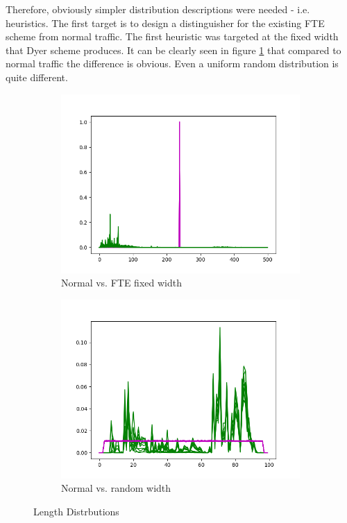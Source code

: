 \documentclass[10pt,a4paper]{article}
\begin{document}
Therefore, obviously simpler distribution descriptions were needed - i.e. heuristics. The first target is to design a distinguisher for the existing FTE scheme from normal traffic. The first heuristic was targeted at the fixed width that Dyer scheme produces. It can be clearly seen in figure \ref{fig:fake_length_dist} that compared to normal traffic the difference is obvious. Even a uniform random distribution is quite different.

\begin{figure}[h]
\begin{subfigure}[b]{.49\linewidth}
\includegraphics[width=\linewidth]{fake_length_dist}
\caption{Normal vs. FTE fixed width}
\label{fig:fake_length_dist}
\end{subfigure}
\begin{subfigure}[b]{.49\linewidth}
\includegraphics[width=\linewidth]{uniform_length_dist}
\caption{Normal vs. random width}
\label{fig:uniform_length_dist}
\end{subfigure}
\caption{Length Distrbutions}
\end{figure}
\end{document}
